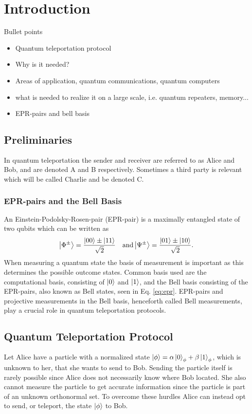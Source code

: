 \section{Introduction}
\begin{mybox}{Bullet points}
    \begin{itemize}
        \item Quantum teleportation protocol
        \item Why is it needed?
        \item Areas of application, quantum communications, quantum computers
        \item what is needed to realize it on a large scale, i.e. quantum repeaters, memory...
        \item EPR-pairs and bell basis
    \end{itemize}
\end{mybox}
\subsection{Preliminaries}
In quantum teleportation the sender and receiver are referred to as Alice and Bob, and are denoted A and B respectively. Sometimes a third party is relevant which will be called Charlie and be denoted C.

\subsubsection{EPR-pairs and the Bell Basis}
An Einstein-Podolsky-Rosen-pair (EPR-pair) is a maximally entangled state of two qubits \cite{Nielsen:2010} which can be written as
\begin{equation}
    \ket{\Phi^\pm} = \frac{\ket{00} \pm \ket{11}}{\sqrt{2}} \quad \text{and} \ket{\Psi^\pm} = \frac{\ket{01} \pm \ket{10}}{\sqrt{2}}.\label{eq:epr}
\end{equation}
When measuring a quantum state the basis of measurement is important as this determines the possible outcome states. Common basis used are the computational basis, consisting of $\ket{0}$ and $\ket{1}$, and the Bell basis consisting of the EPR-pairs, also known as Bell states, seen in Eq. \eqref{eq:epr}. EPR-pairs and projective measurements in the Bell basis, henceforth called Bell measurements, play a crucial role in quantum teleportation protocols. \cite{Nielsen:2010}


\subsection{Quantum Teleportation Protocol}
Let Alice have a particle with a normalized state $\ket{\phi} = \alpha \ket{0}_\phi + \beta \ket{1}_\phi$, which is unknown to her, that she wants to send to Bob. Sending the particle itself is rarely possible since Alice does not necessarily know where Bob located. She also cannot measure the particle to get accurate information since the particle is part of an unknown orthonormal set. To overcome these hurdles Alice can instead opt to send, or teleport, the state $\ket{\phi}$ to Bob. \cite{Bennett:1993}

